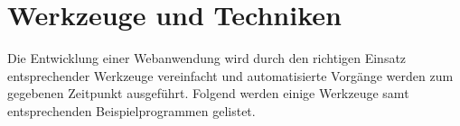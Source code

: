 \section{Werkzeuge und Techniken}
Die Entwicklung einer Webanwendung wird durch den richtigen Einsatz entsprechender Werkzeuge vereinfacht und automatisierte Vorgänge werden zum gegebenen Zeitpunkt ausgeführt. Folgend werden einige Werkzeuge samt entsprechenden Beispielprogrammen gelistet.





